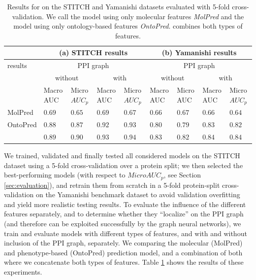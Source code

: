\documentclass{bioinfo}
\begin{document}
\begin{table}[ht]
  \centering
  \begin{tabular}{|p{1.1cm}|p{0.6cm}|p{0.7cm}|p{0.6cm}|p{0.7cm}|p{0.6cm}|p{0.7cm}|p{0.6cm}|p{0.7cm}|}
    \hline
    &\multicolumn{4}{c|}{(a) STITCH results}& \multicolumn{4}{c|}{(b) Yamanishi results}\\
    \hline
    \name{} results&\multicolumn{4}{c|}{PPI graph}&\multicolumn{4}{c|}{PPI graph}\\
    &\multicolumn{2}{c|}{without}&\multicolumn{2}{c|}{with}&\multicolumn{2}{c|}{without}&\multicolumn{2}{c|}{with}\\
    &Macro AUC&Micro $AUC_p$&Macro AUC&Micro $AUC_p$&Macro AUC&Micro AUC&Macro AUC&Micro $AUC_p$\\
    \hline
    MolPred&$0.69$&$0.65$&$0.69$&$0.67$&$0.66$&$0.67$&$0.66$&$0.64$\\
    \hline
    OntoPred&$0.88$&$0.87$&$0.92$&$0.93$&$0.80$&$0.79$&$0.83$&$0.82$\\
    \hline
    \name{} & $0.89$ & $0.90$&$\mathbf{0.93}$&$\mathbf{0.94}$& $0.83$ & $0.82$&$\mathbf{0.84}$&$\mathbf{0.84}$\\
    \hline
  \end{tabular}
  \caption{\label{tab:Results}Results for \name{} on the STITCH
    and Yamanishi datasets evaluated with 5-fold cross-validation. We 
    call the model using only molecular features
    \textit{MolPred} and the model using only ontology-based
    features \textit{OntoPred}. \name{} combines both types of
    features.}
\end{table}

We trained, validated and finally tested all considered models on the
STITCH dataset using a 5-fold cross-validation over a protein split;
we then selected the best-performing models (with respect to
$MicroAUC_p$, see Section \ref{sec:evaluation}), and retrain them from
scratch in a 5-fold protein-split cross-validation on the Yamanishi
benchmark dataset to avoid validation overfitting and yield more
realistic testing results. To evaluate the influence of the different
features separately, and to determine whether they ``localize'' on the
PPI graph (and therefore can be exploited successfully by the graph
neural networks), we train and evaluate models with different types of
features, and with and without inclusion of the PPI graph,
separately. We comparing the molecular (MolPred) and phenotype-based
(OntoPred) prediction model, and a combination of both where we
concatenate both types of features.  Table \ref{tab:Results} shows the
results of these experiments.
\end{document}
